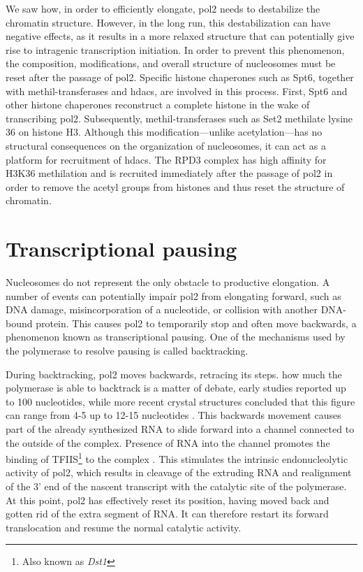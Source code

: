 We saw how, in order to efficiently elongate, \gls{pol2} needs to destabilize the chromatin structure.
However, in the long run, this destabilization can have negative effects, as it results in a more relaxed structure that can potentially give rise to intragenic transcription initiation.
In order to prevent this phenomenon, the composition, modifications, and overall structure of nucleosomes must be reset after the passage of \gls{pol2}. 
Specific histone chaperones such as Spt6, together with methil-transferases and \gls{hdacs}, are involved in this process.
First, Spt6 and other histone chaperones reconstruct a complete histone in the wake of transcribing \gls{pol2}.
Subsequently, methil-transferases such as Set2 methilate lysine 36 on histone H3. 
Although this modification---unlike acetylation---has no structural consequences on the organization of nucleosomes, it can act as a platform for recruitment of \gls{hdacs}.
The RPD3 complex has high affinity for H3K36 methilation and is recruited immediately after the passage of \gls{pol2} in order to remove the acetyl groups from histones and thus reset the structure of chromatin.

\section{Transcriptional pausing} \label{pausing}
Nucleosomes do not represent the only obstacle to productive elongation.
A number of events can potentially impair \gls{pol2} from elongating forward, such as DNA damage, misincorporation of a nucleotide, or collision with another DNA-bound protein.
This causes \gls{pol2} to temporarily stop and often move backwards, a phenomenon known as transcriptional pausing.
One of the mechanisms used by the polymerase to resolve pausing is called backtracking.

During backtracking, \gls{pol2} moves backwards, retracing its steps.
how much the polymerase is able to backtrack \invivo{} is a matter of debate, early \invitro{} studies reported up to 100 nucleotides, while more recent crystal structures concluded that this figure can range from 4-5 up to 12-15 nucleotides \citep{cheung:2011:structural}.
This backwards movement causes part of the already synthesized RNA to slide forward into a channel connected to the outside of the complex.
Presence of RNA into the channel promotes the binding of TFIIS\footnote{Also known as \emph{Dst1}} to the complex \citep{cheung:2011:structural}.
This stimulates the intrinsic endonucleolytic activity of \gls{pol2}, which results in cleavage of the extruding RNA and realignment of the 3' end of the nascent transcript with the catalytic site of the polymerase.
At this point, \gls{pol2} has effectively reset its position, having moved back and gotten rid of the extra segment of RNA. 
It can therefore restart its forward translocation and resume the normal catalytic activity.


